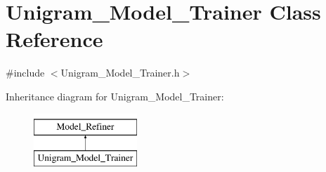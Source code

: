 \hypertarget{class_unigram___model___trainer}{
\section{Unigram\_\-Model\_\-Trainer Class Reference}
\label{class_unigram___model___trainer}
}


{\ttfamily \#include $<$Unigram\_\-Model\_\-Trainer.h$>$}

Inheritance diagram for Unigram\_\-Model\_\-Trainer:\begin{figure}[H]
\begin{center}
\leavevmode
\includegraphics[height=2cm]{class_unigram___model___trainer}
\end{center}
\end{figure}
